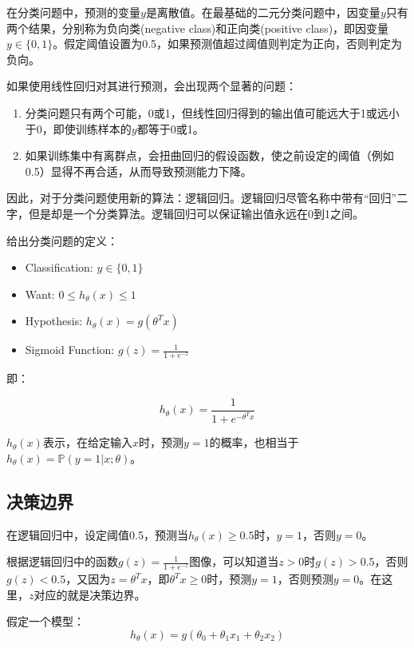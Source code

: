\documentclass[12pt, a4paper]{article}
\begin{document}
在分类问题中，预测的变量$y$是离散值。在最基础的二元分类问题中，因变量$y$只有两个结果，分别称为负向类(negative class)和正向类(positive class)，即因变量$y\in\{0, 1\}$。假定阈值设置为0.5，如果预测值超过阈值则判定为正向，否则判定为负向。

如果使用线性回归对其进行预测，会出现两个显著的问题：

\begin{enumerate}
    \item 分类问题只有两个可能，0或1，但线性回归得到的输出值可能远大于1或远小于0，即使训练样本的$y$都等于0或1。
    \item 如果训练集中有离群点，会扭曲回归的假设函数，使之前设定的阈值（例如0.5）显得不再合适，从而导致预测能力下降。
\end{enumerate}

因此，对于分类问题使用新的算法：逻辑回归。逻辑回归尽管名称中带有“回归”二字，但是却是一个分类算法。逻辑回归可以保证输出值永远在0到1之间。

给出分类问题的定义：

\begin{itemize}
    \item Classification: $y\in\{0, 1\}$
    \item Want: $0\leq h_\theta(x)\leq 1$
    \item Hypothesis: $h_\theta(x)=g(\theta^Tx)$
    \item Sigmoid Function: $g(z)=\frac{1}{1+e^{-z}}$
\end{itemize}

即：

\begin{equation*}
    h_\theta(x)=\frac{1}{1+e^{-\theta^Tx}}
\end{equation*}

$h_\theta(x)$表示，在给定输入$x$时，预测$y=1$的概率，也相当于$h_\theta(x)=\mathbb{P}(y=1|x; \theta)$。

\subsection{决策边界}

在逻辑回归中，设定阈值0.5，预测当$h_\theta(x)\geq 0.5$时，$y=1$，否则$y=0$。

根据逻辑回归中的函数$g(z)=\frac{1}{1+e^{-z}}$图像，可以知道当$z>0$时$g(z)>0.5$，否则$g(z)<0.5$，又因为$z=\theta^Tx$，即$\theta^Tx\geq 0$时，预测$y=1$，否则预测$y=0$。在这里，$z$对应的就是决策边界。

假定一个模型：
\begin{equation*}
    h_\theta(x)=g(\theta_0+\theta_1x_1+\theta_2x_2)
\end{equation*}
\end{document}
